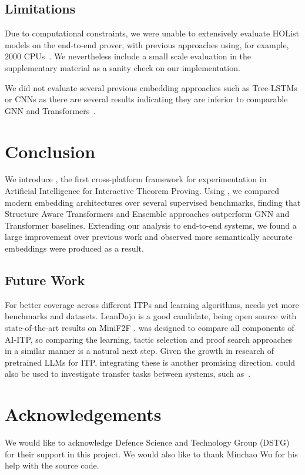 \documentclass[letterpaper]{article} %
\newcommand{\sysname}{\textsc{\sffamily{Bait}}}
\newcommand\alg[1]{\textsc{\sffamily{#1}}}%
\newcommand\dataset[1]{#1}
\begin{document}
    \subsection{Limitations}
    Due to computational constraints, we were unable to extensively evaluate HOList models on the end-to-end prover, with previous approaches using, for example, 2000 CPUs~\cite{bansal_learning_2019}. We nevertheless include a small scale evaluation in the supplementary material as a sanity check on our implementation.

    We did not evaluate several previous embedding approaches such as Tree-LSTMs or CNNs as there are several results indicating they are inferior to comparable GNN and Transformers~\cite{paliwal_graph_2020, wu_int_2020}.


    \section{Conclusion}
    We introduce \sysname{}, the first cross-platform framework for experimentation in Artificial Intelligence for Interactive Theorem Proving. Using \sysname{}, we compared modern embedding architectures over several supervised benchmarks, finding that Structure Aware Transformers and Ensemble approaches outperform GNN and Transformer baselines. Extending our analysis to end-to-end systems, we found a large improvement over previous work and observed more semantically accurate embeddings were produced as a result.

    \subsection{Future Work}
    For better coverage across different ITPs and learning algorithms, \sysname{} needs yet more benchmarks and datasets.
    \dataset{LeanDojo} \cite{yang_leandojo_2023} is a good candidate, being open source with state-of-the-art results on MiniF2F \cite{zheng_minif2f_2021}.
    \sysname{} was designed to compare all components of AI-ITP, so comparing the learning, tactic selection and proof search approaches in a similar manner is a natural next step.
    Given the growth in research of pretrained LLMs for ITP, integrating these is another promising direction.
    \sysname{} could also be used to investigate transfer tasks between systems,  such as~\cite{gauthier_sharing_2015}.

    \section{Acknowledgements}
    We would like to acknowledge Defence Science and Technology Group
    (DSTG) for their support in this project. We would also like to thank
    Minchao Wu for his help with the \alg{TacticZero} source code.


    
\end{document}
